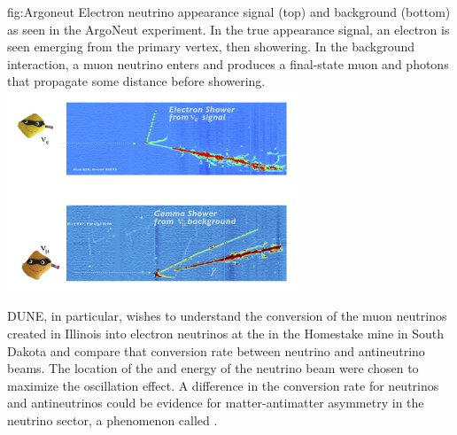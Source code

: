 \documentclass[../main-v1.tex]{subfiles}
\begin{document}
\begin{dunefigure}
{fig:Argoneut}
{Electron neutrino appearance signal (top) and background (bottom) as seen in the ArgoNeut experiment.  In the true appearance signal, an electron is seen emerging from the primary vertex, then showering.  In the background interaction, a muon neutrino enters and  produces a final-state muon and photons that propagate some distance before showering.}
\includegraphics[trim={0cm 0.6cm 2.5cm 0.7cm},clip,height=6cm]{graphics/IntroFigures/Fig_02_Argoneut.jpg} 
\end{dunefigure}


DUNE,  in particular,   wishes to understand the conversion of the muon neutrinos created in Illinois%
 into electron neutrinos at the  in the Homestake mine in South Dakota  %
and compare that conversion rate between neutrino and antineutrino beams. The location of the  and energy of the neutrino beam were chosen to maximize the oscillation effect.   A difference in the conversion rate for neutrinos and antineutrinos could be evidence for matter-antimatter asymmetry in the neutrino sector, a phenomenon called .  
\end{document}

